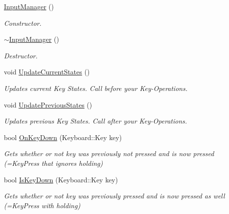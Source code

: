 \begin{DoxyCompactItemize}
\item 
\mbox{\hyperlink{class_the_project_1_1_input_manager_a4bee47367bbc3f06230a564483577981}{Input\+Manager}} ()
\begin{DoxyCompactList}\small\item\em Constructor. \end{DoxyCompactList}\item 
\mbox{\hyperlink{class_the_project_1_1_input_manager_a706dff36758aa33b2f9057849ee74dca}{$\sim$\+Input\+Manager}} ()
\begin{DoxyCompactList}\small\item\em Destructor. \end{DoxyCompactList}\item 
void \mbox{\hyperlink{class_the_project_1_1_input_manager_a766d64cfa0d1ad4e78b42c03a32d02eb}{Update\+Current\+States}} ()
\begin{DoxyCompactList}\small\item\em Updates current Key States. Call before you\textquotesingle{}r Key-\/\+Operations. \end{DoxyCompactList}\item 
void \mbox{\hyperlink{class_the_project_1_1_input_manager_aefc6ce350e1ab78cc3aaef145c55a65a}{Update\+Previous\+States}} ()
\begin{DoxyCompactList}\small\item\em Updates previous Key States. Call after you\textquotesingle{}r Key-\/\+Operations. \end{DoxyCompactList}\item 
bool \mbox{\hyperlink{class_the_project_1_1_input_manager_aba7f889c5258aa96a7314371755a03ac}{On\+Key\+Down}} (Keyboard\+::\+Key key)
\begin{DoxyCompactList}\small\item\em Gets whether or not key was previously not pressed and is now pressed (=Key\+Press that ignores holding) \end{DoxyCompactList}\item 
bool \mbox{\hyperlink{class_the_project_1_1_input_manager_a01544ca4b1cf91f0eff474fb0270acbe}{Is\+Key\+Down}} (Keyboard\+::\+Key key)
\begin{DoxyCompactList}\small\item\em Gets whether or not key was previously pressed and is now pressed as well (=Key\+Press with holding) \end{DoxyCompactList}\end{DoxyCompactItemize}


